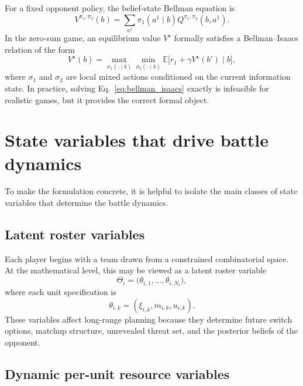 \documentclass[aps,pre,twocolumn,superscriptaddress,nofootinbib]{revtex4-2}
\newcommand{\EE}{\mathbb{E}}
\theoremstyle{definition}
\theoremstyle{plain}
\begin{document}
For a fixed opponent policy, the belief-state Bellman equation is
\begin{equation}
    V^{\pi_1,\pi_2}(b)
    =
    \sum_{a^1} \pi_1(a^1\mid b)
    Q^{\pi_1,\pi_2}(b,a^1).
\end{equation}
In the zero-sum game, an equilibrium value $V^\star$ formally satisfies a Bellman--Isaacs relation of the form
\begin{equation}
    V^\star(b)
    =
    \max_{\sigma_1(\cdot\mid b)}
    \min_{\sigma_2(\cdot\mid b)}
    \EE\big[r_1 + \gamma V^\star(b')\mid b\big],
    \label{eq:bellman_isaacs}
\end{equation}
where $\sigma_1$ and $\sigma_2$ are local mixed actions conditioned on the current information state. In practice, solving Eq.~\eqref{eq:bellman_isaacs} exactly is infeasible for realistic games, but it provides the correct formal object.

\section{State variables that drive battle dynamics}
\label{sec:dynamicsdetail}

To make the formulation concrete, it is helpful to isolate the main classes of state variables that determine the battle dynamics.

\subsection{Latent roster variables}

Each player begins with a team drawn from a constrained combinatorial space. At the mathematical level, this may be viewed as a latent roster variable
\begin{equation}
    \Theta_i = \big(\theta_{i,1},\dots,\theta_{i,N_i}\big),
\end{equation}
where each unit specification is
\begin{equation}
    \theta_{i,k} = (\xi_{i,k},m_{i,k},u_{i,k}).
\end{equation}
These variables affect long-range planning because they determine future switch options, matchup structure, unrevealed threat set, and the posterior beliefs of the opponent.

\subsection{Dynamic per-unit resource variables}
\end{document}
